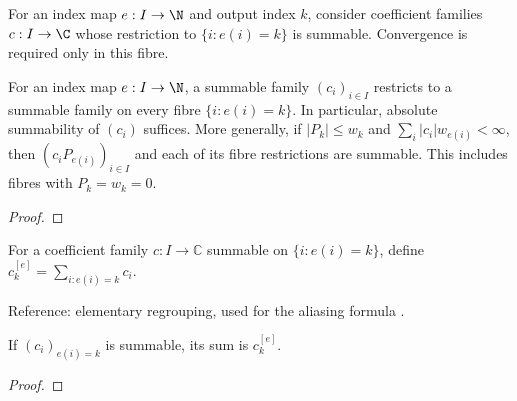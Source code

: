 \begin{supporting}

\begin{definition}
\label{def:regrouped-coefficient-input}
\leanok
For an index map $e:I\to\N$ and output index $k$, consider coefficient families $c:I\to\C$ whose restriction to $\{i:e(i)=k\}$ is summable.
Convergence is required only in this fibre.
\end{definition}

\begin{theorem}
\label{thm:regrouped-coefficient-input}
\leanok
For an index map $e:I\to\N$, a summable family $(c_i)_{i\in I}$
restricts to a summable family on every fibre $\{i:e(i)=k\}$.
In particular, absolute summability of $(c_i)$ suffices.
More generally, if $|P_k|\le w_k$ and $\sum_i|c_i|w_{e(i)}<\infty$, then
$(c_iP_{e(i)})_{i\in I}$ and each of its fibre restrictions are summable.
This includes fibres with $P_k=w_k=0$.
\end{theorem}
\begin{proof}
\leanok
\end{proof}


\begin{definition}
\label{def:regrouped-coefficients}
\leanok
For a coefficient family $c:I\to\mathbb C$ summable on $\{i:e(i)=k\}$, define
$c^{[e]}_k=\sum_{i:e(i)=k}c_i$.

Reference: elementary regrouping, used for the aliasing formula \cite[Theorem 4.2]{atap}.
\end{definition}

\begin{theorem}
\label{thm:regrouped-coefficient-value}
\leanok
If $(c_i)_{e(i)=k}$ is summable, its sum is $c^{[e]}_k$.
\end{theorem}
\begin{proof}
\leanok
\end{proof}


\end{supporting}
